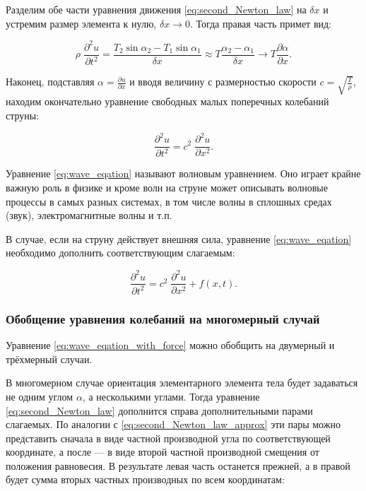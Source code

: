 \documentclass[12pt,a4paper,russian]{report}
\begin{document}
	Разделим обе части уравнения движения \eqref{eq:second_Newton_law} на $\delta x$ и устремим размер элемента к нулю, $\delta x \rightarrow 0$. Тогда правая часть примет вид:
	
	\begin{equation}  \label{eq:second_Newton_law_approx}
		\rho \; \frac{\partial^2 u}{\partial t^2} = \frac{T_2 \sin \alpha_2 - T_1 \sin \alpha_1}{\delta x} \approx T \frac{\alpha_2 - \alpha_1}{\delta x} \rightarrow T \frac{\partial \alpha}{\partial x}.
	\end{equation}
	
	Наконец, подставляя $\alpha = \frac{\partial u}{\partial x}$ и вводя величину с размерностью скорости $c = \sqrt{\frac{T}{\rho}}$, находим окончательно уравнение свободных малых поперечных колебаний струны:  
	
	\begin{equation} \label{eq:wave_eqation}
		\frac{\partial^2 u}{\partial t^2} = c^2 \; \frac{\partial^2 u}{\partial x^2}.
	\end{equation}

	Уравнение \eqref{eq:wave_eqation} называют волновым уравнением. Оно играет крайне важную роль в физике и кроме волн на струне может описывать волновые процессы в самых разных системах, в том числе волны в сплошных средах (звук), электромагнитные волны и т.п.
	
	В случае, если на струну действует внешняя сила, уравнение \eqref{eq:wave_eqation} необходимо дополнить соответствующим слагаемым:
	
	\begin{equation} \label{eq:wave_eqation_with_force}
		\frac{\partial^2 u}{\partial t^2} = c^2 \; \frac{\partial^2 u}{\partial x^2} + f(x, t).
	\end{equation}
	
	\subsubsection{Обобщение уравнения колебаний на многомерный случай}
	
	
	Уравнение \eqref{eq:wave_eqation_with_force} можно обобщить на двумерный и трёхмерный случаи.  
	
	В многомерном случае ориентация элементарного элемента тела будет задаваться не одним углом $\alpha$, а несколькими углами. Тогда уравнение \eqref{eq:second_Newton_law} дополнится справа дополнительными парами слагаемых. По аналогии с \eqref{eq:second_Newton_law_approx} эти пары можно представить сначала в виде частной производной угла по соответствующей координате, а после --- в виде второй частной производной смещения от положения равновесия. В результате левая часть останется прежней, а в правой будет сумма вторых частных производных по всем координатам:
	
\end{document}
